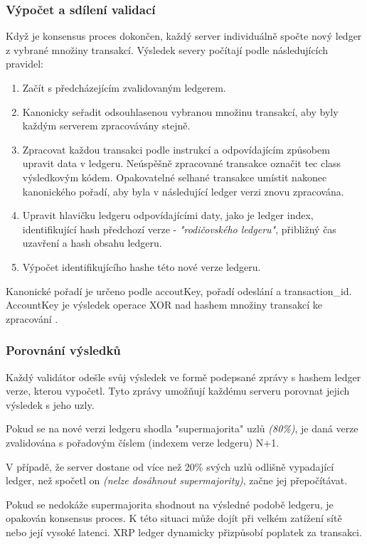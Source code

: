 \documentclass[hidelinks, titlepage]{article}
\begin{document}
\subsubsection{Výpočet a sdílení validací}
Když je konsensus proces dokončen, každý server individuálně spočte nový ledger z vybrané množiny transakcí. Výsledek severy počítají podle následujících pravidel:
\begin{enumerate}
\item Začít s předcházejícím zvalidovaným ledgerem.
\item Kanonicky seřadit odsouhlasenou vybranou množinu transakcí, aby byly každým serverem zpracovávány stejně.
\item Zpracovat každou transakci podle instrukcí a odpovídajícím způsobem upravit data v ledgeru. Neúspěšně zpracované transakce označit tec class výsledkovým kódem. Opakovatelné selhané transakce umístit nakonec kanonického pořadí, aby byla v následující ledger verzi znovu zpracována.
\item Upravit hlavičku ledgeru odpovídajícími daty, jako je ledger index, identifikující hash předchozí verze - \textit{"rodičovského ledgeru"}, přibližný čas uzavření a hash obsahu ledgeru.
\item Výpočet identifikujícího hashe této nové verze ledgeru.
\end{enumerate}

Kanonické pořadí je určeno podle accoutKey, pořadí odeslání a transaction\_id. AccountKey je výsledek operace XOR nad hashem množiny transakcí ke zpracování \cite{order}.

\subsubsection{Porovnání výsledků}
Každý validátor odešle svůj výsledek ve formě podepsané zprávy s hashem ledger verze, kterou vypočetl. Tyto zprávy umožňují každému serveru porovnat jejich výsledek s jeho uzly.

Pokud se na nové verzi ledgeru shodla "supermajorita" uzlů \textit{(80\%)}, je daná verze zvalidována s pořadovým číslem (indexem verze ledgeru) N+1.

V případě, že server dostane od více než 20\% svých uzlů odlišně vypadající ledger, než spočetl on \textit{(nelze dosáhnout supermajority)}, začne jej přepočítávat.

Pokud se nedokáže supermajorita shodnout na výsledné podobě ledgeru, je opakován konsensus proces. K této situaci může dojít při velkém zatížení sítě nebo její vysoké latenci. XRP ledger dynamicky přizpůsobí poplatek za transakci\cite{consensus}.
\end{document}
